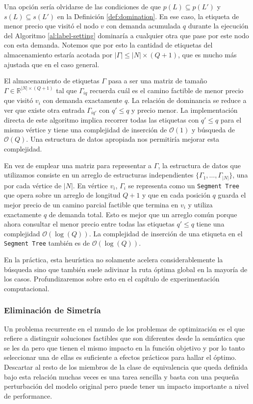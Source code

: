 Una opción sería olvidarse de las condiciones de que $p(L) \subseteq p(L')$ y $s(L) \subseteq s(L')$ en la Definición \ref{def:domination}. En ese caso, la etiqueta de menor precio que visitó el nodo $v$ con demanda acumulada $q$ durante la ejecución del Algoritmo \ref{al:label-setting} dominaría a cualquier otra que pase por este nodo con esta demanda. Notemos que por esto la cantidad de etiquetas del almacenamiento estaría acotada por $|\Gamma| \leq |N| \times (Q+1)$, que es mucho más ajustada que en el caso general.

El almacenamiento de etiquetas $\Gamma$ pasa a ser una matriz de tamaño $\Gamma \in \mathbb{R}^{|N| \times (Q+1)}$ tal que $\Gamma_{iq}$ recuerda cuál es el camino factible de menor precio que visitó $v_i$ con demanda exactamente $q$. La relación de dominancia se reduce a ver que existe otra entrada $\Gamma_{iq'}$ con $q' \leq q$ y precio menor. La implementación directa de este algoritmo implica recorrer todas las etiquetas con $q' \leq q$ para el mismo vértice y tiene una complejidad de inserción de $\mathcal{O}(1)$ y búsqueda de $\mathcal{O}(Q)$. Una estructura de datos apropiada nos permitiría mejorar esta complejidad.

En vez de emplear una matriz para representar a $\Gamma$, la estructura de datos que utilizamos consiste en un arreglo de estructuras independientes $\{\Gamma_1, \dots, \Gamma_{|N|}\}$, una por cada vértice de $|N|$. En vértice $v_i$, $\Gamma_i$ se representa como un \texttt{Segment Tree} que opera sobre un arreglo de longitud $Q + 1$ y que en cada posición $q$ guarda el mejor precio de un camino parcial factible que termina en $v_i$ y utiliza exactamente $q$ de demanda total. Esto es mejor que un arreglo común porque ahora consultar el menor precio entre todas las etiquetas $q' \leq q$ tiene una complejidad $\mathcal{O}(\log(Q))$. La complejidad de inserción de una etiqueta en el \texttt{Segment Tree} también es de $\mathcal{O}(\log(Q))$.

En la práctica, esta heurística no solamente acelera considerablemente la bús\-queda sino que también suele adivinar la ruta óptima global en la mayoría de los casos. Profundizaremos sobre esto en el capítulo de experimentación computacional.


\subsubsection{Eliminación de Simetría}

Un problema recurrente en el mundo de los problemas de optimización es el que refiere a distinguir soluciones factibles que son diferentes desde la semántica que se les da pero que tienen el mismo impacto en la función objetivo y por lo tanto seleccionar una de ellas es suficiente a efectos prácticos para hallar el óptimo. Descartar al resto de los miembros de la clase de equivalencia que queda definida bajo esta relación muchas veces es una tarea sencilla y basta con una pequeña perturbación del modelo original pero puede tener un impacto importante a nivel de performance. 

